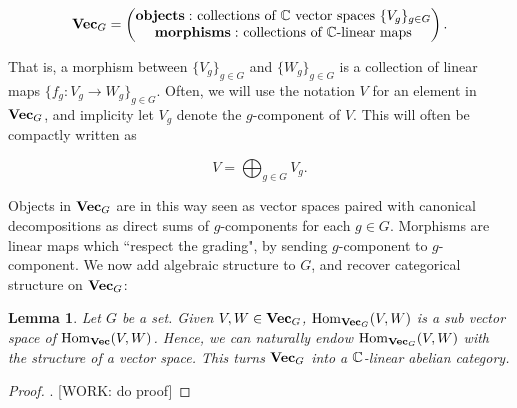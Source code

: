 \documentclass{article}
\newtheorem{lemma}{Lemma}[section]
\theoremstyle{definition}
\numberwithin{figure}{section}
\begin{document}
$$\bold{Vec}_G=
\begin{pmatrix}
\bold{objects: }\text{ collections of $\mathbb{C}$ vector spaces }\{V_g\}_{g\in G}\\
\bold{morphisms: }\text{ collections of $\mathbb{C}$-linear maps}
\end{pmatrix}.$$

That is, a morphism between $\{V_g\}_{g\in G}$ and $\{W_g\}_{g\in G}$ is a collection of linear maps $\{f_g:V_g\to W_g\}_{g\in G}.$ Often, we will use the notation $V$ for an element in $\bold{Vec}_G$, and implicity let $V_g$ denote the $g$-component of $V$. This will often be compactly written as

$$V=\bigoplus_{g\in G}V_g.$$

Objects in $\bold{Vec}_G$ are in this way seen as vector spaces paired with canonical decompositions as direct sums of $g$-components for each $g\in G$. Morphisms are linear maps which ``respect the grading", by sending $g$-component to $g$-component. We now add algebraic structure to $G$, and recover categorical structure on $\bold{Vec}_G$:

\begin{lemma} Let $G$ be a set. Given $V,W\in \bold{Vec}_G$, $\mathrm{Hom}_{\bold{Vec}_G}(V,W)$ is a sub vector space of $\mathrm{Hom}_{\bold{Vec}}(V,W)$. Hence, we can naturally endow $\mathrm{Hom}_{\bold{Vec}_G}(V,W)$ with the structure of a vector space. This turns $\bold{Vec}_G$ into a $\mathbb{C}$-linear abelian category.
\end{lemma}
\begin{proof}. [WORK: do proof]
\end{proof}
\end{document}
